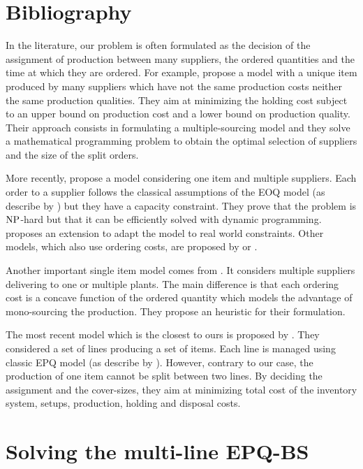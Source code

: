 \section{Bibliography}



In the literature, our problem is often formulated as the decision of the assignment of production between many suppliers, the ordered quantities and the time at which they are ordered.
For example, \citet{Hong1992} propose a model with a unique item produced by many suppliers which have not the same production costs neither the same production qualities.
They aim at minimizing the holding cost subject to an upper bound on production cost and a lower bound on production quality.
Their approach consists in formulating a multiple-sourcing model and they solve a mathematical programming problem to obtain the optimal selection of suppliers and the size of the split orders.


More recently, \citet{Rosenblatt1998} propose a model considering one item and multiple suppliers.
Each order to a supplier follows the classical assumptions of the EOQ model (as describe by \citet{Harris1913}) but they have a capacity constraint.
They prove that the problem is $\operatorname{NP}$-hard but that it can be efficiently solved with dynamic programming.
\citet{Chang2006} proposes an extension to adapt the model to real world constraints.
Other models, which also use ordering costs, are proposed by \citet{Kim2005} or \citet{Park2006}.


Another important single item model comes from \citet{Chauhan2003}.
It considers multiple suppliers delivering to one or multiple plants.
The main difference is that each ordering cost is a concave function of the ordered quantity which models the advantage of mono-sourcing the production.
They propose an heuristic for their formulation.


The most recent model which is the closest to ours is proposed by \citet{Nobil2016}.
They considered a set of lines producing a set of items.
Each line is managed using classic EPQ model (as describe by \citet{Taft1918}).
However, contrary to our case, the production of one item cannot be split between two lines.
By deciding the assignment and the cover-sizes, they aim at minimizing total cost of the inventory system, setups, production, holding and disposal costs.





\section{Solving the multi-line EPQ-BS}


